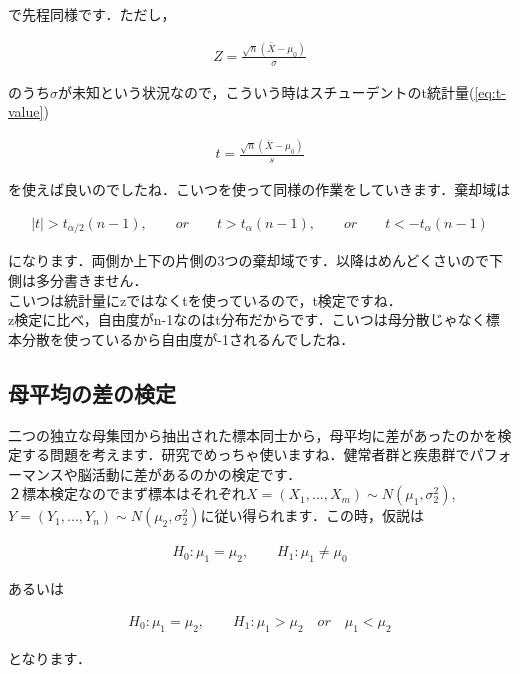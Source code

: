 \documentclass[11pt,a4paper]{ujreport} 	%
\begin{document}
で先程同様です．ただし，

\begin{align}
  Z = \frac{\sqrt{n}(\bar{X}-\mu_0)}{\sigma}
\end{align}

のうち$\sigma$が未知という状況なので，こういう時はスチューデントのt統計量(\ref{eq:t-value})

\begin{align}
  t = \frac{\sqrt{n}(\bar{X}-\mu_0)}{s}
\end{align}

を使えば良いのでしたね．こいつを使って同様の作業をしていきます．棄却域は

\begin{align}
  |t| > t_{\alpha/2}(n-1), \qquad or \qquad t>t_\alpha(n-1), \qquad or \qquad t<-t_\alpha(n-1)
\end{align}

になります．両側か上下の片側の3つの棄却域です．以降はめんどくさいので下側は多分書きません．\\

こいつは統計量にzではなくtを使っているので，t検定ですね．\\

z検定に比べ，自由度がn-1なのはt分布だからです．こいつは母分散じゃなく標本分散を使っているから自由度が-1されるんでしたね．

\subsection{母平均の差の検定}
二つの独立な母集団から抽出された標本同士から，母平均に差があったのかを検定する問題を考えます．研究でめっちゃ使いますね．健常者群と疾患群でパフォーマンスや脳活動に差があるのかの検定です．\\

２標本検定なのでまず標本はそれぞれ$X=(X_1,...,X_m) \sim N(\mu_1, \sigma_2^2)$, $Y=(Y_1,...,Y_n) \sim N(\mu_2, \sigma_2^2)$に従い得られます．この時，仮説は

\begin{align}
  H_0 : \mu_1 = \mu_2, \qquad H_1 : \mu_1 \neq \mu_0
\end{align}

あるいは

\begin{align}
  H_0 : \mu_1 = \mu_2, \qquad H_1 : \mu_1 > \mu_2 \quad or\quad \mu_1 < \mu_2
\end{align}

となります．\\
\end{document}
